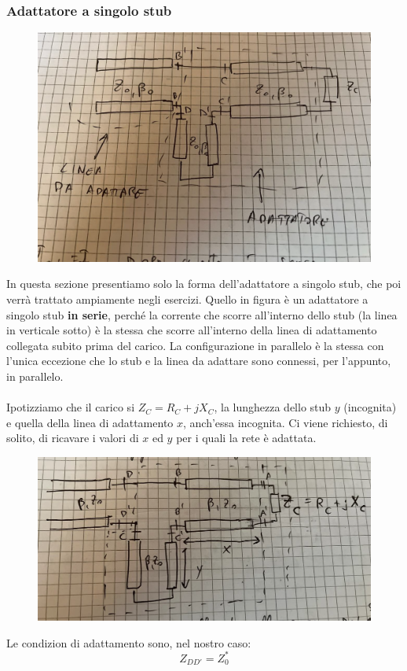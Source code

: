 \documentclass{book}
\begin{document}
        \subsubsection*{Adattatore a singolo stub}
        \begin{figure}[h!]
            \center  
            \includegraphics[width=0.5\linewidth]{Chapter_two/Chapt2img19.png}
        \end{figure}
        In questa sezione presentiamo solo la forma dell'adattatore a singolo stub, che poi verrà trattato
        ampiamente negli esercizi. Quello in figura è un adattatore a singolo stub \textbf{in serie}, perché la corrente che scorre all'interno
        dello stub (la linea in verticale sotto) è la stessa che scorre all'interno della linea di adattamento collegata subito prima del carico.
        La configurazione in parallelo è la stessa con l'unica eccezione che lo stub e la linea da adattare sono connessi, per l'appunto, in parallelo.
        \\ \\
        Ipotizziamo che il carico si $Z_{C}=R_{C}+jX_{C}$, la lunghezza dello stub $y$ (incognita) e quella della linea di adattamento $x$, anch'essa incognita.
        Ci viene richiesto, di solito, di ricavare i valori di $x$ ed $y$ per i quali la rete è adattata.
        \begin{figure}[h!]
            \center  
            \includegraphics[width=0.6\linewidth]{Chapter_two/Chapt2img20.png}
        \end{figure}
        Le condizion di adattamento sono, nel nostro caso:
        \begin{equation}
            Z_{DD'} = Z_{0} ^{*}
        \end{equation}
\end{document}
